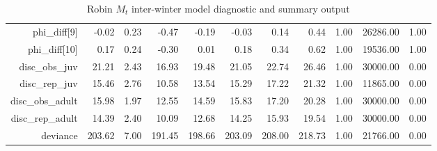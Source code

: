 \begin{table}[ht]
\begin{tabular}{rrrrrrrrrrr}
  phi\_diff[9] & -0.02 & 0.23 & -0.47 & -0.19 & -0.03 & 0.14 & 0.44 & 1.00 & 26286.00 & 1.00 \\ 
  phi\_diff[10] & 0.17 & 0.24 & -0.30 & 0.01 & 0.18 & 0.34 & 0.62 & 1.00 & 19536.00 & 1.00 \\ 
  disc\_obs\_juv & 21.21 & 2.43 & 16.93 & 19.48 & 21.05 & 22.74 & 26.46 & 1.00 & 30000.00 & 0.00 \\ 
  disc\_rep\_juv & 15.46 & 2.76 & 10.58 & 13.54 & 15.29 & 17.22 & 21.32 & 1.00 & 11865.00 & 0.00 \\ 
  disc\_obs\_adult & 15.98 & 1.97 & 12.55 & 14.59 & 15.83 & 17.20 & 20.28 & 1.00 & 30000.00 & 0.00 \\ 
  disc\_rep\_adult & 14.39 & 2.40 & 10.09 & 12.68 & 14.25 & 15.93 & 19.54 & 1.00 & 30000.00 & 0.00 \\ 
  deviance & 203.62 & 7.00 & 191.45 & 198.66 & 203.09 & 208.00 & 218.73 & 1.00 & 21766.00 & 0.00 \\ 
   \hline
\end{tabular}
\caption{Robin $M_t$ inter-winter model diagnostic and summary output} 
\label{tab:robin_mt_age_inter_summary_output}
\end{table}
